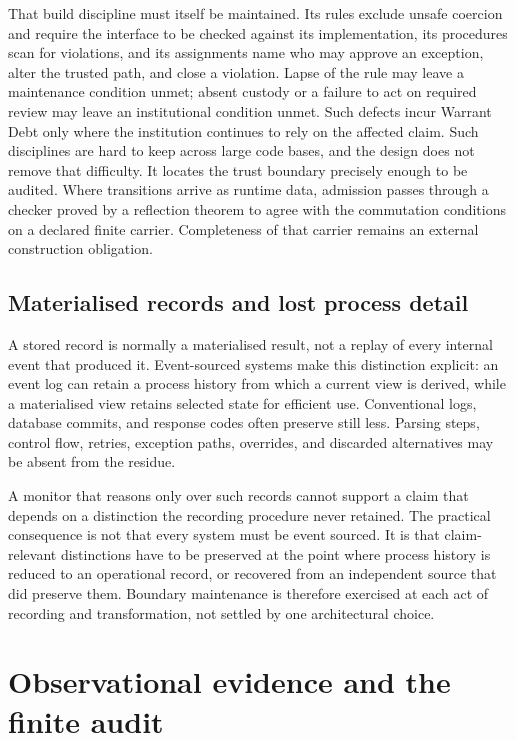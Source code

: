 \documentclass[11pt]{article}
\theoremstyle{definition}
\begin{document}
That build discipline must itself be maintained. Its rules exclude unsafe coercion and require the interface to be checked against its implementation, its procedures scan for violations, and its assignments name who may approve an exception, alter the trusted path, and close a violation. Lapse of the rule may leave a maintenance condition unmet; absent custody or a failure to act on required review may leave an institutional condition unmet. Such defects incur Warrant Debt only where the institution continues to rely on the affected claim. Such disciplines are hard to keep across large code bases, and the design does not remove that difficulty. It locates the trust boundary precisely enough to be audited. Where transitions arrive as runtime data, admission passes through a checker proved by a reflection theorem to agree with the commutation conditions on a declared finite carrier. Completeness of that carrier remains an external construction obligation.

\subsection{Materialised records and lost process detail}\label{ex:sec:settlement}

A stored record is normally a materialised result, not a replay of every internal event that produced it. Event-sourced systems make this distinction explicit: an event log can retain a process history from which a current view is derived, while a materialised view retains selected state for efficient use. Conventional logs, database commits, and response codes often preserve still less. Parsing steps, control flow, retries, exception paths, overrides, and discarded alternatives may be absent from the residue.

A monitor that reasons only over such records cannot support a claim that depends on a distinction the recording procedure never retained. The practical consequence is not that every system must be event sourced. It is that claim-relevant distinctions have to be preserved at the point where process history is reduced to an operational record, or recovered from an independent source that did preserve them. Boundary maintenance is therefore exercised at each act of recording and transformation, not settled by one architectural choice.

\section{Observational evidence and the finite audit}\label{ex:sec:observational}
\end{document}
